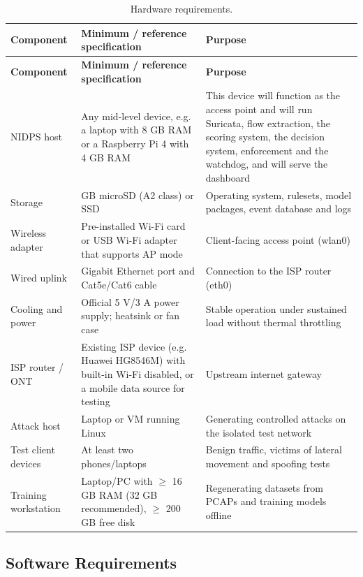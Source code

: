 {\small
\begin{longtable}{|>{\raggedright\arraybackslash}p{}|>{\raggedright\arraybackslash}p{}|>{\raggedright\arraybackslash}p{}|}
\caption{Hardware requirements.}\label{tab:4.15}\\
\hline
\textbf{Component} & \textbf{Minimum / reference specification} & \textbf{Purpose} \\ \hline
\endfirsthead
\hline
\textbf{Component} & \textbf{Minimum / reference specification} & \textbf{Purpose} \\ \hline
\endhead
NIDPS host & Any mid-level device, e.g. a laptop with 8 GB RAM or a Raspberry Pi 4 with 4 GB RAM & This device will function as the access point and will run Suricata, flow extraction, the scoring system, the decision system, enforcement and the watchdog, and will serve the dashboard \\ \hline
Storage & 32 GB microSD (A2 class) or SSD & Operating system, rulesets, model packages, event database and logs \\ \hline
Wireless adapter & Pre-installed Wi-Fi card or USB Wi-Fi adapter that supports AP mode & Client-facing access point (wlan0) \\ \hline
Wired uplink & Gigabit Ethernet port and Cat5e/Cat6 cable & Connection to the ISP router (eth0) \\ \hline
Cooling and power & Official 5 V/3 A power supply; heatsink or fan case & Stable operation under sustained load without thermal throttling \\ \hline
ISP router / ONT & Existing ISP device (e.g. Huawei HG8546M) with built-in Wi-Fi disabled, or a mobile data source for testing & Upstream internet gateway \\ \hline
Attack host & Laptop or VM running Linux & Generating controlled attacks on the isolated test network \\ \hline
Test client devices & At least two phones/laptops & Benign traffic, victims of lateral movement and spoofing tests \\ \hline
Training workstation & Laptop/PC with $\geq$ 16 GB RAM (32 GB recommended), $\geq$ 200 GB free disk & Regenerating datasets from PCAPs and training models offline \\ \hline
\end{longtable}
}

\subsection{Software Requirements}\label{sec:4.7.2}

